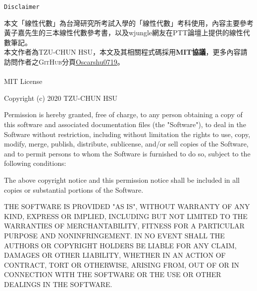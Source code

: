 \begin{center}
    \Huge{\texttt{Disclaimer}}\\
\end{center}

本文「線性代數」為台灣研究所考試入學的「線性代數」考科使用，內容主要參考黃子嘉先生的三本線性代數參考書\cite{1}\cite{2}\cite{3}，以及wjungle網友在PTT論壇上提供的線性代數筆記\cite{4}。 \\
本文作者為\textsc{TZU-CHUN HSU}，本文及其相關程式碼採用\textbf{MIT協議}，更多內容請訪問作者之\textsc{GitHub}分頁\href{https://github.com/Oscarshu0719}{Oscarshu0719}。 \\~\\

\con
MIT License

Copyright (c) 2020 TZU-CHUN HSU

Permission is hereby granted, free of charge, to any person obtaining a copy
of this software and associated documentation files (the "Software"), to deal
in the Software without restriction, including without limitation the rights
to use, copy, modify, merge, publish, distribute, sublicense, and/or sell
copies of the Software, and to permit persons to whom the Software is
furnished to do so, subject to the following conditions:

The above copyright notice and this permission notice shall be included in all
copies or substantial portions of the Software.

THE SOFTWARE IS PROVIDED "AS IS", WITHOUT WARRANTY OF ANY KIND, EXPRESS OR
IMPLIED, INCLUDING BUT NOT LIMITED TO THE WARRANTIES OF MERCHANTABILITY,
FITNESS FOR A PARTICULAR PURPOSE AND NONINFRINGEMENT. IN NO EVENT SHALL THE
AUTHORS OR COPYRIGHT HOLDERS BE LIABLE FOR ANY CLAIM, DAMAGES OR OTHER
LIABILITY, WHETHER IN AN ACTION OF CONTRACT, TORT OR OTHERWISE, ARISING FROM,
OUT OF OR IN CONNECTION WITH THE SOFTWARE OR THE USE OR OTHER DEALINGS IN THE
SOFTWARE.

\tnr
\pagebreak
